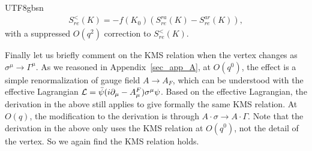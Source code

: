 \documentclass[11pt]{article}\def\baselinestretch{1.4}
\def\G{{\Gamma}}
\def\m{{\mu}}
\def\s{{\sigma}}
\newcommand{\pd}{{\partial}}
\begin{document}
\begin{CJK}{UTF8}{gbsn}
\begin{align}
S_{re}^<(K)=-f(K_0)(S_{re}^{ra}(K)-S_{re}^{ar}(K)),
\end{align}
with a suppressed $O(q^2)$ correction to $S_{re}^<(K)$.

Finally let us briefly comment on the KMS relation when the vertex changes as $\s^\m\to\G^\m$. As we reasoned in Appendix~\ref{sec_app_A}, at $O(q^0)$, the effect is a simple renormalization of gauge field $A\to A_F$, which can be understood with the effective Lagrangian ${\cal L}=\bar{\psi}(i\pd_\m-A^F_\m)\s^\m\psi$. Based on the effective Lagrangian, the derivation in the above still applies to give formally the same KMS relation. At $O(q)$, the modification to the derivation is through $A\cdot\s\to A\cdot\G$. Note that the derivation in the above only uses the KMS relation at $O(q^0)$, not the detail of the vertex. So we again find the KMS relation holds.


\end{CJK}
\end{document}
